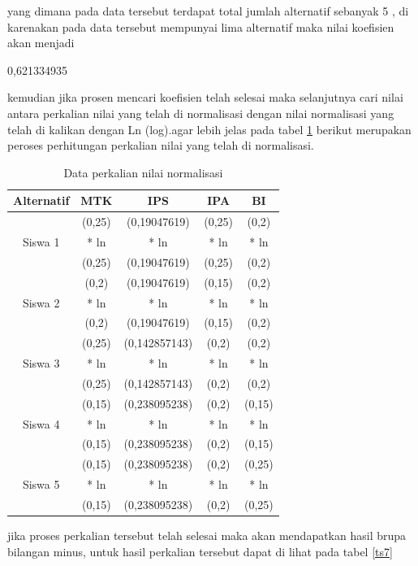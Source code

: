 yang dimana pada data tersebut terdapat total jumlah alternatif sebanyak 5 , di karenakan pada data tersebut mempunyai lima alternatif maka nilai koefisien akan menjadi \par

0,621334935 \par
\pagebreak
kemudian jika prosen mencari koefisien telah selesai maka selanjutnya cari nilai antara perkalian nilai yang telah di normalisasi dengan nilai normalisasi yang telah di kalikan dengan Ln (log).agar lebih jelas pada tabel \ref{ts6} berikut merupakan peroses perhitungan perkalian nilai yang telah di normalisasi.


\begin{table}[h]
\caption{Data perkalian nilai normalisasi}
\centering
\begin{tabular}{|c|c|c|c|c|}
\hline
Alternatif & MTK & IPS & IPA&BI\\
\hline
\multirow{3}{*}{Siswa 1} & (0,25) & (0,19047619)& (0,25) &(0,2)\\
&* ln  &* ln  &* ln  &* ln \\
&(0,25) & (0,19047619) &(0,25) &(0,2)\\
\hline
\multirow{3}{*}{Siswa 2}&(0,2)&(0,19047619)&(0,15) &(0,2)\\
&* ln  &* ln  &* ln  &* ln \\
&(0,2)&(0,19047619)&(0,15) &(0,2)\\
\hline
\multirow{3}{*}{Siswa 3}&(0,25)&(0,142857143) &(0,2)&(0,2)\\
&* ln  &* ln  &* ln  &* ln\\
&(0,25)&(0,142857143) &(0,2)&(0,2)\\
\hline
\multirow{3}{*}{Siswa 4}&(0,15)&(0,238095238)&(0,2)&(0,15)\\
&* ln  &* ln  &* ln  &* ln\\
&(0,15)&(0,238095238)&(0,2)&(0,15)\\
\hline
\multirow{3}{*}{Siswa 5}&(0,15)&(0,238095238)&(0,2)&(0,25)\\
&* ln  &* ln  &* ln  &* ln\\
&(0,15)&(0,238095238)&(0,2)&(0,25)\\
\hline
\end{tabular}
\label{ts6}
\end{table}


jika proses perkalian tersebut telah selesai maka akan mendapatkan hasil brupa bilangan minus, untuk hasil perkalian tersebut dapat di lihat pada tabel \ref{ts7}

